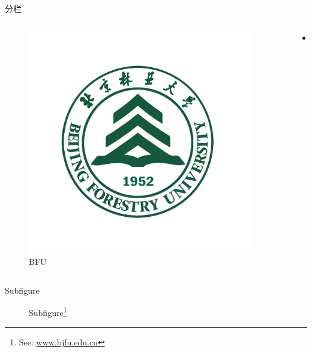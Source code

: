 \documentclass[hyperref,UTF8,11pt,aspectratio=169]{beamer}
\begin{document}
\begin{frame}{分栏}
    \begin{columns}
        \begin{column}{0.3\textwidth}
            \begin{figure}
                \centering
                \includegraphics[width=0.95\textwidth]{logo.png}
                \caption{BFU}\label{fig:bfu}
            \end{figure}
        \end{column}
        \begin{column}{0.7\textwidth}
            \begin{itemize}
                \item ...
            \end{itemize}
        \end{column}
    \end{columns}
\end{frame}

\begin{frame}{Subfigure}
    \begin{figure}
        \centering
        \caption{Subfigure\footnote{See: \url{www.bjfu.edu.cn}}}\label{fig:rnn}
    \end{figure}
\end{frame}
\end{document}
